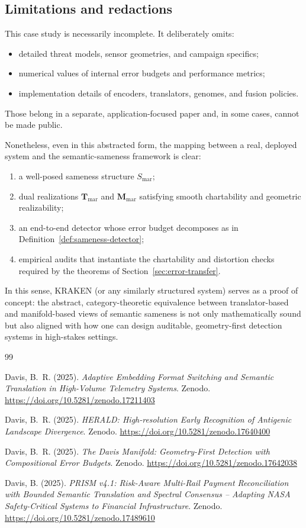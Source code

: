 \documentclass[11pt]{article}
\begin{document}
\subsection{Limitations and redactions}

This case study is necessarily incomplete. It deliberately omits:
\begin{itemize}
  \item detailed threat models, sensor geometries, and campaign specifics;
  \item numerical values of internal error budgets and performance metrics;
  \item implementation details of encoders, translators, genomes, and fusion
        policies.
\end{itemize}
Those belong in a separate, application-focused paper and, in some cases,
cannot be made public.

Nonetheless, even in this abstracted form, the mapping between a real, deployed
system and the semantic-sameness framework is clear:
\begin{enumerate}
  \item a well-posed sameness structure $S_{\mathrm{mar}}$;
  \item dual realizations $\mathbf{T}_{\mathrm{mar}}$ and $\mathbf{M}_{\mathrm{mar}}$
        satisfying smooth chartability and geometric realizability;
  \item an end-to-end detector whose error budget decomposes as in
        Definition~\ref{def:sameness-detector};
  \item empirical audits that instantiate the chartability and distortion checks
        required by the theorems of Section~\ref{sec:error-transfer}.
\end{enumerate}
In this sense, KRAKEN (or any similarly structured system) serves as a proof of
concept: the abstract, category-theoretic equivalence between translator-based
and manifold-based views of semantic sameness is not only mathematically sound
but also aligned with how one can design auditable, geometry-first detection
systems in high-stakes settings.

\begin{thebibliography}{99}

Davis, B.~R. (2025).
\emph{Adaptive Embedding Format Switching and Semantic Translation in High-Volume Telemetry Systems}.
Zenodo.
\url{https://doi.org/10.5281/zenodo.17211403}

Davis, B.~R. (2025).
\emph{HERALD: High-resolution Early Recognition of Antigenic Landscape Divergence}.
Zenodo.
\url{https://doi.org/10.5281/zenodo.17640400}

Davis, B.~R. (2025).
\emph{The Davis Manifold: Geometry-First Detection with Compositional Error Budgets}.
Zenodo.
\url{https://doi.org/10.5281/zenodo.17642038}

Davis, B. (2025).
\emph{PRISM v4.1: Risk-Aware Multi-Rail Payment Reconciliation with Bounded Semantic Translation and Spectral Consensus -- Adapting NASA Safety-Critical Systems to Financial Infrastructure}.
Zenodo.
\url{https://doi.org/10.5281/zenodo.17489610}

\end{thebibliography}
\end{document}
